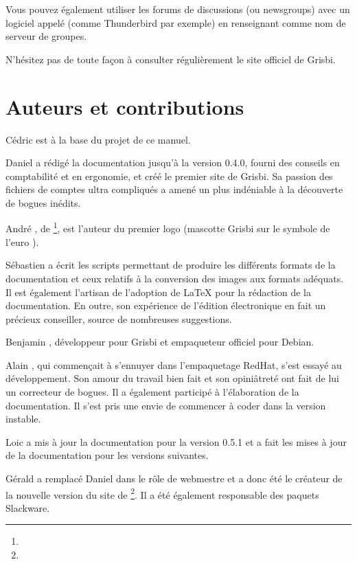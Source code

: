 Vous pouvez également utiliser les forums de discussions (ou newsgroups) avec un logiciel appelé  (comme Thunderbird par exemple) en renseignant  comme nom de serveur de groupes.

N'hésitez pas de toute façon à consulter régulièrement le site officiel de Grisbi.



\section{Auteurs et contributions\label{introduction-authors}}		%


Cédric  est à la base du projet de ce manuel.

Daniel  a rédigé la documentation jusqu'à la version 0.4.0, fourni des conseils en comptabilité et en ergonomie, et créé le premier site de Grisbi. Sa passion des fichiers de comptes ultra compliqués a amené un plus indéniable à la découverte de bogues inédits.

André , de \footnote{\urlLinuxGraphic{}}, est l'auteur du premier logo (mascotte Grisbi sur le symbole de l'euro \texteuro{}).

Sébastien  a écrit les scripts permettant de produire les différents formats de la documentation et ceux relatifs à la conversion des images aux formats adéquats. Il est également l'artisan de l'adoption de \gls{LaTeX} pour la rédaction de la documentation. En outre, son expérience de l'édition électronique en fait un précieux conseiller, source de nombreuses suggestions.

Benjamin , développeur pour Grisbi et empaqueteur officiel pour \gls{Debian}.

Alain , qui commençait à s'ennuyer dans l'empaquetage \gls{RedHat}, s'est essayé au développement. Son amour du travail bien fait et son opiniâtreté ont fait de lui un correcteur de bogues. Il a également participé à l'élaboration de la documentation. Il s'est pris une envie de commencer à coder dans la version instable.

Loic  a mis à jour la documentation pour la version 0.5.1 et a fait les mises à jour de la documentation pour les versions suivantes.

Gérald  a remplacé Daniel  dans le rôle de webmestre et a donc été le créateur de la nouvelle version du site de \footnote{\urlGrisbi{}}. Il a été également responsable des paquets \gls{Slackware}.

